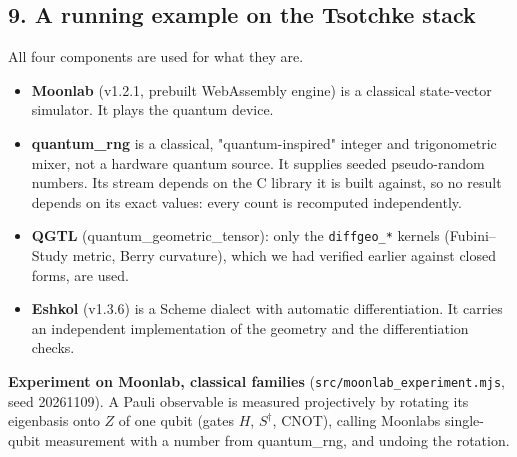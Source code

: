 \documentclass[11pt,a4paper]{article}
\providecommand{\tightlist}{\setlength{\itemsep}{0pt}\setlength{\parskip}{0pt}}
\begin{document}
\subsection{9. A running example on the Tsotchke stack}\label{9-a-running-example-on-the-tsotchke-stack}

All four components are used for what they are.

\begin{itemize}
\tightlist
\item
  \textbf{Moonlab} (v1.2.1, prebuilt WebAssembly engine) is a classical state-vector simulator. It plays
  the quantum device.
\item
  \textbf{quantum\_rng} is a classical, "quantum-inspired" integer and trigonometric mixer, not a hardware
  quantum source. It supplies seeded pseudo-random numbers. Its stream depends on the C library it is
  built against, so no result depends on its exact values: every count is recomputed independently.
\item
  \textbf{QGTL} (quantum\_geometric\_tensor): only the \texttt{diffgeo\_*} kernels (Fubini--Study metric, Berry
  curvature), which we had verified earlier against closed forms, are used.
\item
  \textbf{Eshkol} (v1.3.6) is a Scheme dialect with automatic differentiation. It carries an independent
  implementation of the geometry and the differentiation checks.
\end{itemize}

\textbf{Experiment on Moonlab, classical families} (\texttt{src/moonlab\_experiment.mjs}, seed 20261109). A Pauli
observable is measured projectively by rotating its eigenbasis onto \(Z\) of one qubit (gates \(H\),
\(S^\dagger\), CNOT), calling Moonlab\textquotesingle s single-qubit measurement with a number from quantum\_rng, and
undoing the rotation.
\end{document}

